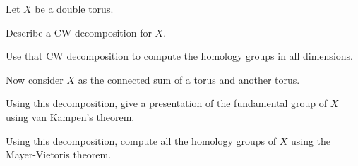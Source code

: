 Let $X$ be a double torus.
\begin{alist}
\item Describe a CW decomposition for $X$.
\item Use that CW decomposition to compute the homology groups in all
dimensions.
\item Now consider $X$ as the connected sum of a torus and another
torus.
\item Using this decomposition, give a presentation of the fundamental
group of $X$ using van Kampen's theorem.
\item Using this decomposition, compute all the homology groups of $X$
using the Mayer-Vietoris theorem.
\end{alist}
